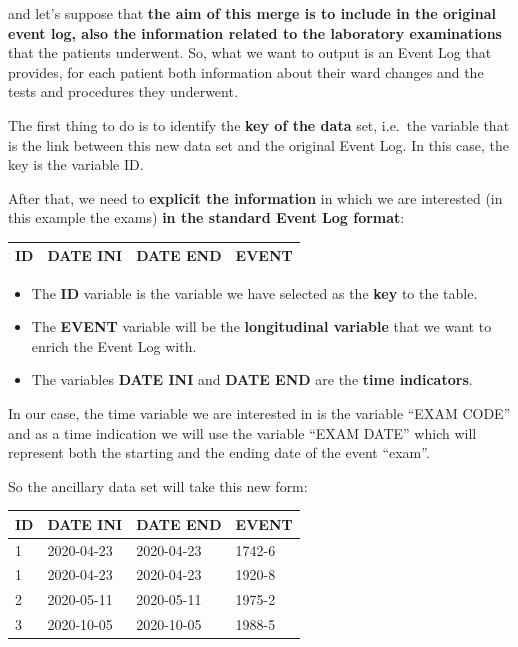 \documentclass[
]{book}
\begin{document}
and let's suppose that \textbf{the aim of this merge is to include in the original event log, also the information related to the laboratory examinations} that the patients underwent.
So, what we want to output is an Event Log that provides, for each patient both information about their ward changes and the tests and procedures they underwent.

The first thing to do is to identify the \textbf{key of the data} set, i.e.~the variable that is the link between this new data set and the original Event Log. In this case, the key is the variable ID.

After that, we need to \textbf{explicit the information} in which we are interested (in this example the exams) \textbf{in the standard Event Log format}:

\begin{longtable}[]{@{}llll@{}}
\toprule
ID & DATE INI & DATE END & EVENT \\
\midrule
\endhead
\bottomrule
\end{longtable}

\begin{itemize}
\item
  The \textbf{ID} variable is the variable we have selected as the \textbf{key} to the table.
\item
  The \textbf{EVENT} variable will be the \textbf{longitudinal variable} that we want to enrich the Event Log with.
\item
  The variables \textbf{DATE INI} and \textbf{DATE END} are the \textbf{time indicators}.
\end{itemize}

In our case, the time variable we are interested in is the variable ``EXAM CODE'' and as a time indication we will use the variable ``EXAM DATE'' which will represent both the starting and the ending date of the event ``exam''.

So the ancillary data set will take this new form:

\begin{longtable}[]{@{}llll@{}}
\toprule
ID & DATE INI & DATE END & EVENT \\
\midrule
\endhead
1 & 2020-04-23 & 2020-04-23 & 1742-6 \\
1 & 2020-04-23 & 2020-04-23 & 1920-8 \\
2 & 2020-05-11 & 2020-05-11 & 1975-2 \\
3 & 2020-10-05 & 2020-10-05 & 1988-5 \\
\bottomrule
\end{longtable}
\end{document}
